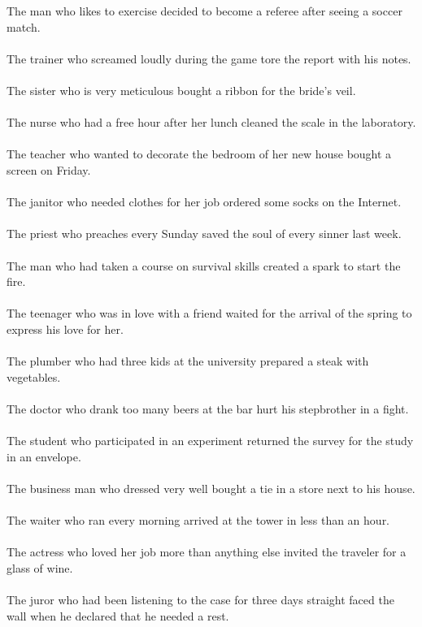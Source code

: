 The man who likes to exercise decided to become a referee after seeing a soccer match.	\\	\\
The trainer who screamed loudly during the game tore the report with his notes.	\\	\\
The sister who is very meticulous bought a ribbon for the bride's veil.	\\	\\
The nurse who had a free hour after her lunch cleaned the scale in the laboratory.	\\	\\
The teacher who wanted to decorate the bedroom of her new house bought a screen on Friday.	\\	\\
The janitor who needed clothes for her job ordered some socks on the Internet.	\\	\\
The priest who preaches every Sunday saved the soul of every sinner last week.	\\	\\
The man who had taken a course on survival skills created a spark to start the fire.	\\	\\
The teenager who was in love with a friend waited for the arrival of the spring to express his love for her.	\\	\\
The plumber who had three kids at the university prepared a steak with vegetables.	\\	\\
The doctor who drank too many beers at the bar hurt his stepbrother in a fight.	\\	\\
The student who participated in an experiment returned the survey for the study in an envelope.	\\	\\
The business man who dressed very well bought a tie in a store next to his house.	\\	\\
The waiter who ran every morning arrived at the tower in less than an hour.	\\	\\
The actress who loved her job more than anything else invited the traveler for a glass of wine.	\\	\\
The juror who had been listening to the case for three days straight faced the wall when he declared that he needed a rest.	\\	\\
